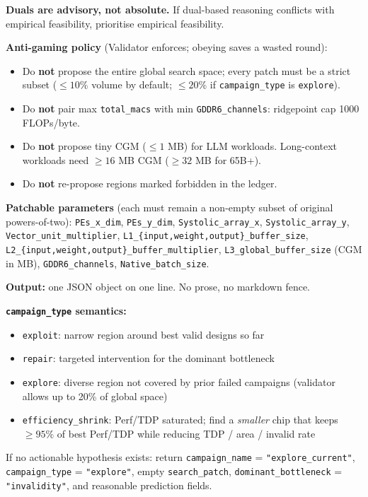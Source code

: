 \begin{tcolorbox}
\noindent\textbf{Duals are advisory, not absolute.} If dual-based
reasoning conflicts with empirical feasibility, prioritise empirical
feasibility.

\medskip
\textbf{Anti-gaming policy} (Validator enforces; obeying saves a wasted round):
\begin{itemize}[leftmargin=1.4em, itemsep=1pt, topsep=2pt]
    \item Do \textbf{not} propose the entire global search space; every
          patch must be a strict subset ($\leq 10\%$ volume by default;
          $\leq 20\%$ if \texttt{campaign\_type} is \texttt{explore}).
    \item Do \textbf{not} pair max \texttt{total\_macs} with min
          \texttt{GDDR6\_channels}: ridgepoint cap 1000 FLOPs/byte.
    \item Do \textbf{not} propose tiny CGM ($\leq 1$ MB) for LLM
          workloads. Long-context workloads need $\geq 16$ MB CGM
          ($\geq 32$ MB for 65B+).
    \item Do \textbf{not} re-propose regions marked forbidden in the
          ledger.
\end{itemize}

\medskip
\textbf{Patchable parameters} (each must remain a non-empty subset of
original powers-of-two):
\texttt{PEs\_x\_dim}, \texttt{PEs\_y\_dim}, \texttt{Systolic\_array\_x},
\texttt{Systolic\_array\_y}, \texttt{Vector\_unit\_multiplier},
\texttt{L1\_\{input,weight,output\}\_buffer\_size},
\texttt{L2\_\{input,weight,output\}\_buffer\_multiplier},
\texttt{L3\_global\_buffer\_size} (CGM in MB),
\texttt{GDDR6\_channels}, \texttt{Native\_batch\_size}.

\medskip
\textbf{Output:} one JSON object on one line. No prose, no markdown fence.

\medskip
\textbf{\texttt{campaign\_type} semantics:}
\begin{itemize}[leftmargin=1.4em, itemsep=1pt, topsep=2pt]
    \item \texttt{exploit}: narrow region around best valid designs so far
    \item \texttt{repair}: targeted intervention for the dominant bottleneck
    \item \texttt{explore}: diverse region not covered by prior failed
          campaigns (validator allows up to 20\% of global space)
    \item \texttt{efficiency\_shrink}: Perf/TDP saturated; find a
          \emph{smaller} chip that keeps $\geq 95\%$ of best Perf/TDP
          while reducing TDP / area / invalid rate
\end{itemize}

\noindent If no actionable hypothesis exists: return
\texttt{campaign\_name} = \texttt{"explore\_current"},
\texttt{campaign\_type} = \texttt{"explore"}, empty
\texttt{search\_patch}, \texttt{dominant\_bottleneck} =
\texttt{"invalidity"}, and reasonable prediction fields.

\end{tcolorbox}
